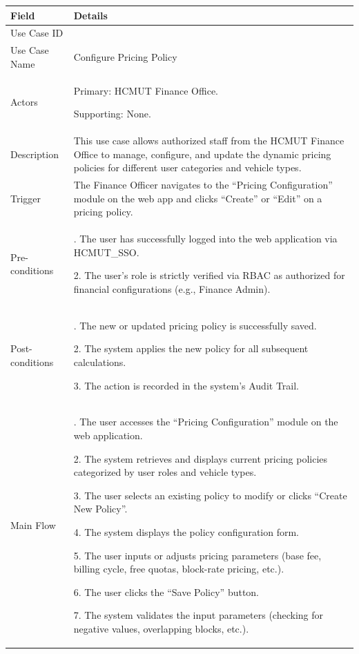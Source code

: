 \begin{table}[H]
\small
\renewcommand{\arraystretch}{1.4}
\begin{tabularx}{\textwidth}{|>{\raggedright\arraybackslash}p{3.5cm}|>{\RaggedRight\arraybackslash}X|}
\hline
\rowcolor{gray!20} \textbf{Field} & \textbf{Details} \\
\hline
Use Case ID & 3.3 \\
\hline
Use Case Name & Configure Pricing Policy \\
\hline
Actors & Primary: HCMUT Finance Office. \par Supporting: None. \\
\hline
Description & This use case allows authorized staff from the HCMUT Finance Office to manage, configure, and update the dynamic pricing policies for different user categories and vehicle types. \\
\hline
Trigger & The Finance Officer navigates to the ``Pricing Configuration'' module on the web app and clicks ``Create'' or ``Edit'' on a pricing policy. \\
\hline
Pre-conditions & 1. The user has successfully logged into the web application via HCMUT\_SSO. \par 2. The user's role is strictly verified via RBAC as authorized for financial configurations (e.g., Finance Admin). \\
\hline
Post-conditions & 1. The new or updated pricing policy is successfully saved. \par 2. The system applies the new policy for all subsequent calculations. \par 3. The action is recorded in the system's Audit Trail. \\
\hline
Main Flow & 
1. The user accesses the ``Pricing Configuration'' module on the web application. \par
2. The system retrieves and displays current pricing policies categorized by user roles and vehicle types. \par
3. The user selects an existing policy to modify or clicks ``Create New Policy''. \par
4. The system displays the policy configuration form. \par
5. The user inputs or adjusts pricing parameters (base fee, billing cycle, free quotas, block-rate pricing, etc.). \par
6. The user clicks the ``Save Policy'' button. \par
7. The system validates the input parameters (checking for negative values, overlapping blocks, etc.). \par

\end{tabularx}
\end{table}
